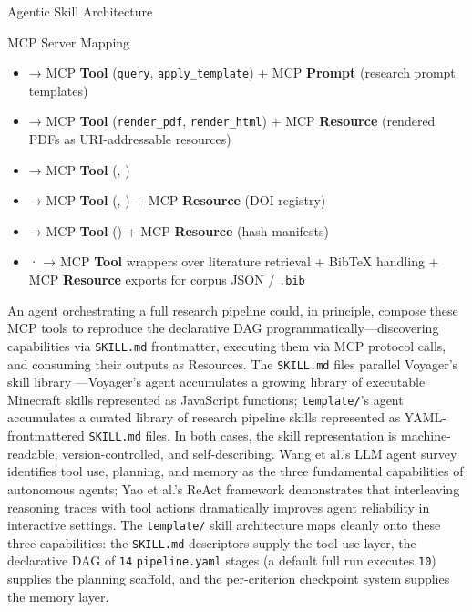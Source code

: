 \documentclass[
  ignorenonframetext,
]{beamer}
\providecommand{\tightlist}{%
  \setlength{\itemsep}{0pt}\setlength{\parskip}{0pt}}
\begin{document}
\begin{frame}{Agentic Skill Architecture}
\begin{block}{MCP Server Mapping}
\begin{itemize}
\tightlist
\item
   → MCP \textbf{Tool} (\texttt{query},
  \texttt{apply\_template}) + MCP \textbf{Prompt} (research prompt
  templates)
\item
   → MCP \textbf{Tool}
  (\texttt{render\_pdf}, \texttt{render\_html}) + MCP \textbf{Resource}
  (rendered PDFs as URI-addressable resources)
\item
   → MCP \textbf{Tool}
  (, )
\item
   → MCP \textbf{Tool}
  (, ) +
  MCP \textbf{Resource} (DOI registry)
\item
   → MCP \textbf{Tool}
  () + MCP \textbf{Resource}
  (hash manifests)
\item
   ·  →
  MCP \textbf{Tool} wrappers over literature retrieval + BibTeX handling
  + MCP \textbf{Resource} exports for corpus JSON / \texttt{.bib}
\end{itemize}

An agent orchestrating a full research pipeline could, in principle,
compose these MCP tools to reproduce the declarative DAG
programmatically---discovering capabilities via \texttt{SKILL.md}
frontmatter, executing them via MCP protocol calls, and consuming their
outputs as Resources. The \texttt{SKILL.md} files parallel Voyager's
skill library ---Voyager's agent accumulates a
growing library of executable Minecraft skills represented as JavaScript
functions; \texttt{template/}'s agent accumulates a curated library of
research pipeline skills represented as YAML-frontmattered
\texttt{SKILL.md} files. In both cases, the skill representation is
machine-readable, version-controlled, and self-describing. Wang et al.'s
LLM agent survey  identifies tool use, planning,
and memory as the three fundamental capabilities of autonomous agents;
Yao et al.'s ReAct framework  demonstrates that
interleaving reasoning traces with tool actions dramatically improves
agent reliability in interactive settings. The \texttt{template/} skill
architecture maps cleanly onto these three capabilities: the
\texttt{SKILL.md} descriptors supply the tool-use layer, the declarative
DAG of \texttt{14} \texttt{pipeline.yaml} stages (a default full run
executes \texttt{10}) supplies the planning scaffold, and the
per-criterion checkpoint system supplies the memory layer.
\end{block}
\end{frame}
\end{document}
